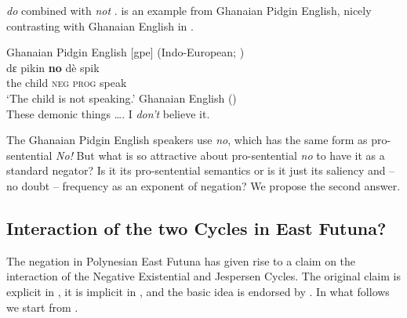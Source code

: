 ﻿\documentclass[output=paper]{langsci/langscibook}
\begin{document}
\textit{do} combined with \textit{not} \parencite[140--141]{Auwera2017}.
 is an example from
Ghanaian Pidgin
English, nicely contrasting with Ghanaian English in
.
%
\begin{exe}
\ex\label{ex:int-ghanaianpidginenglish-child}
Ghanaian Pidgin English [gpe] (Indo-European;
\cites[140]{Auwera2017}[398]{Huber2012a})\\
    \gll dε  pikin  \textbf{no}  dè  spik \\
    the  child  \textsc{neg}  \textsc{prog}  speak \\
    \glt `The child is not speaking.'
    \ex\label{ex:int-ghanaianenglish-demonic}
Ghanaian English (\cites[140]{Auwera2017}[385]{Huber2012b})\\
    These demonic things …. I \textit{don't} believe it.
    \end{exe}
%
The Ghanaian Pidgin English speakers use \textit{no}, which has the same
form as pro-sentential \textit{No!} But what is so attractive about
pro-sentential \textit{no} to have it as a standard negator? Is it its
pro-sentential semantics or is it just its saliency and -- no doubt --
frequency as an exponent of negation? We propose the second answer.

\subsection{Interaction of the two Cycles in East
Futuna?}\label{sec:int-4.2}

The negation in Polynesian East Futuna has given rise to a
claim on the interaction of the Negative Existential and Jespersen Cycles.
The original claim is explicit in \textcite[18]{Mosel1999}, it is implicit in
\textcite[122]{MoyseFaurie1999}, and the basic idea is endorsed by
\textcite[1359--1364]{Veselinova2014}. In what follows we start from
\textcite{Veselinova2014}.
\end{document}
